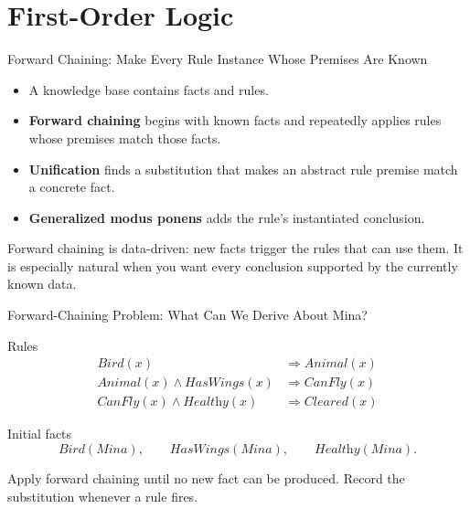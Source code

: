 \documentclass[aspectratio=169,10pt]{beamer}
\begin{document}
\section{First-Order Logic}

\begin{frame}{Forward Chaining: Make Every Rule Instance Whose Premises Are Known}
  \begin{itemize}
    \item A knowledge base contains facts and rules.
    \item \textbf{Forward chaining} begins with known facts and repeatedly applies rules whose premises match those facts.
    \item \textbf{Unification} finds a substitution that makes an abstract rule premise match a concrete fact.
    \item \textbf{Generalized modus ponens} adds the rule's instantiated conclusion.
  \end{itemize}
  \begin{keyidea}
    Forward chaining is data-driven: new facts trigger the rules that can use them. It is especially natural when you want every conclusion supported by the currently known data.
  \end{keyidea}
\end{frame}

\begin{frame}{Forward-Chaining Problem: What Can We Derive About Mina?}
  \small
  \begin{block}{Rules}
    \[
    \begin{aligned}
      \textit{Bird}(x) &\Rightarrow \textit{Animal}(x)\\
      \textit{Animal}(x)\land\textit{HasWings}(x) &\Rightarrow \textit{CanFly}(x)\\
      \textit{CanFly}(x)\land\textit{Healthy}(x) &\Rightarrow \textit{Cleared}(x)
    \end{aligned}
    \]
  \end{block}
  \begin{block}{Initial facts}
    \[
      \textit{Bird}(\textit{Mina}),\qquad
      \textit{HasWings}(\textit{Mina}),\qquad
      \textit{Healthy}(\textit{Mina}).
    \]
  \end{block}
  Apply forward chaining until no new fact can be produced. Record the substitution whenever a rule fires.
\end{frame}
\end{document}
